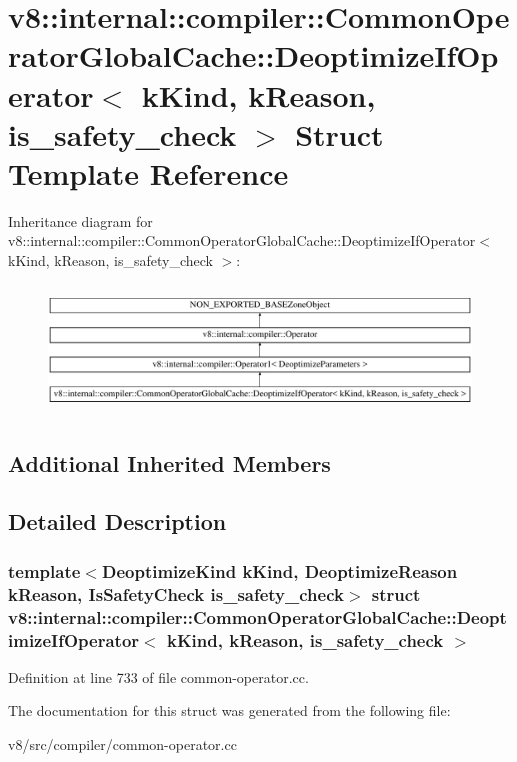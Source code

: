 \hypertarget{structv8_1_1internal_1_1compiler_1_1CommonOperatorGlobalCache_1_1DeoptimizeIfOperator}{}\section{v8\+:\+:internal\+:\+:compiler\+:\+:Common\+Operator\+Global\+Cache\+:\+:Deoptimize\+If\+Operator$<$ k\+Kind, k\+Reason, is\+\_\+safety\+\_\+check $>$ Struct Template Reference}
\label{structv8_1_1internal_1_1compiler_1_1CommonOperatorGlobalCache_1_1DeoptimizeIfOperator}
Inheritance diagram for v8\+:\+:internal\+:\+:compiler\+:\+:Common\+Operator\+Global\+Cache\+:\+:Deoptimize\+If\+Operator$<$ k\+Kind, k\+Reason, is\+\_\+safety\+\_\+check $>$\+:\begin{figure}[H]
\begin{center}
\leavevmode
\includegraphics[height=3.440860cm]{structv8_1_1internal_1_1compiler_1_1CommonOperatorGlobalCache_1_1DeoptimizeIfOperator}
\end{center}
\end{figure}
\subsection*{Additional Inherited Members}


\subsection{Detailed Description}
\subsubsection*{template$<$Deoptimize\+Kind k\+Kind, Deoptimize\+Reason k\+Reason, Is\+Safety\+Check is\+\_\+safety\+\_\+check$>$\newline
struct v8\+::internal\+::compiler\+::\+Common\+Operator\+Global\+Cache\+::\+Deoptimize\+If\+Operator$<$ k\+Kind, k\+Reason, is\+\_\+safety\+\_\+check $>$}



Definition at line 733 of file common-\/operator.\+cc.



The documentation for this struct was generated from the following file\+:\begin{DoxyCompactItemize}
\item 
v8/src/compiler/common-\/operator.\+cc\end{DoxyCompactItemize}
